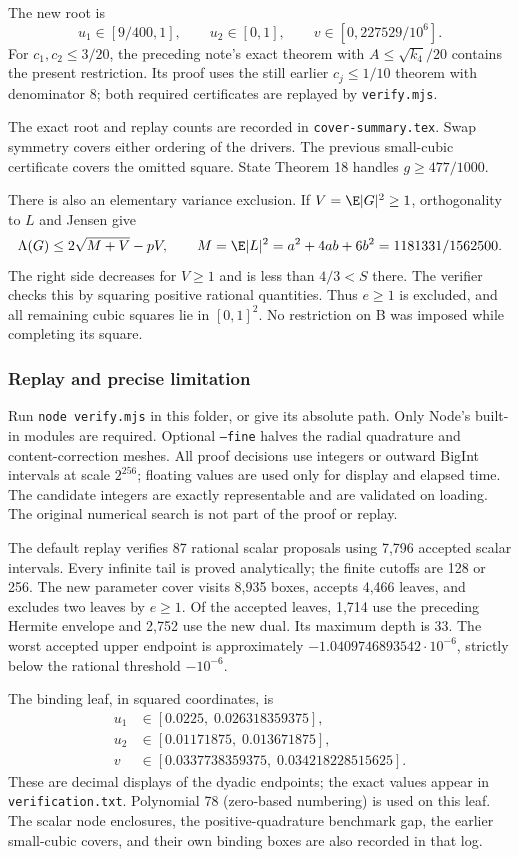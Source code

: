 The new root is
\[
u_1\in[9/400,1],\qquad u_2\in[0,1],\qquad
v\in[0,227529/10^6].
\]
For $c_1,c_2\le3/20$, the preceding note's exact theorem with
$A\le\sqrt{k_4}/20$ contains the present restriction. Its proof uses
the still earlier $c_j\le1/10$ theorem with denominator $8$;
both required certificates are replayed by \texttt{verify.mjs}.

The exact root and replay counts are recorded in
\texttt{cover-summary.tex}. Swap symmetry covers either ordering of the
drivers. The previous small-cubic certificate covers the omitted square.
State Theorem 18 handles $g\ge477/1000$.

There is also an elementary variance exclusion. If $V=\E|G|^2\ge1$,
orthogonality to $L$ and Jensen give
\[
\Lambda(G)\le2\sqrt{M+V}-pV,\qquad
M=\E|L|^2=a^2+4ab+6b^2=1181331/1562500.
\]
The right side decreases for $V\ge1$ and is less than $4/3<S$ there.
The verifier checks this by squaring positive rational quantities.
Thus $e\ge1$ is excluded, and all remaining cubic squares lie in
$[0,1]^2$. No restriction on B was imposed while completing its square.

\subsubsection{Replay and precise limitation}
Run \texttt{node verify.mjs} in this folder, or give its absolute path.
Only Node's built-in modules are required. Optional \texttt{--fine}
halves the radial quadrature and content-correction meshes. All proof
decisions use integers or outward BigInt intervals at scale $2^{256}$;
floating values are used only for display and elapsed time. The candidate
integers are exactly representable and are validated on loading.
The original numerical search is not part of the proof or replay.

The default replay verifies 87 rational scalar proposals using 7,796
accepted scalar intervals. Every infinite tail is proved analytically;
the finite cutoffs are 128 or 256.
The new parameter cover visits 8,935 boxes, accepts 4,466 leaves,
and excludes two leaves by $e\ge1$. Of the accepted leaves,
1,714 use the preceding Hermite envelope and 2,752 use the new dual.
Its maximum depth is 33. The worst accepted upper endpoint is
approximately $-1.0409746893542\cdot10^{-6}$, strictly below the
rational threshold $-10^{-6}$.

The binding leaf, in squared coordinates, is
\[
\begin{split}
u_1&\in[0.0225,\;0.026318359375],\\
u_2&\in[0.01171875,\;0.013671875],\\
v&\in[0.0337738359375,\;0.034218228515625].
\end{split}
\]
These are decimal displays of the dyadic endpoints; the exact values
appear in \texttt{verification.txt}. Polynomial 78 (zero-based numbering)
is used on this leaf. The scalar node enclosures, the positive-quadrature
benchmark gap, the earlier small-cubic covers, and their own binding
boxes are also recorded in that log.

